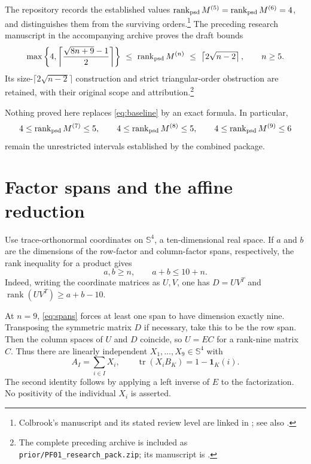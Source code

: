 \documentclass[11pt]{article}
\theoremstyle{remark}\newtheorem{remark}[theorem]{Remark}
\newcommand{\Sym}{\mathbb S}
\newcommand{\tr}{\operatorname{tr}}
\newcommand{\rank}{\operatorname{rank}}
\newcommand{\psdrank}{\operatorname{rank}_{\rm psd}}
\newcommand{\one}{\mathbf 1}
\begin{document}
The repository records the established values $\psdrank M^{(5)}=\psdrank M^{(6)}=4$, and distinguishes them from the surviving orders.\footnote{Colbrook's manuscript and its stated review level are linked in \cite{repo}; see also \cite{colbrook}.} The preceding research manuscript in the accompanying archive proves the draft bounds
\begin{equation}\label{eq:baseline}
 \max\left\{4,\left\lceil\frac{\sqrt{8n+9}-1}{2}\right\rceil\right\}
 \ \leq\ \psdrank M^{(n)}\ \leq\ \left\lceil2\sqrt{n-2}\right\rceil,
 \qquad n\geq5.
\end{equation}
Its size-$\lceil2\sqrt{n-2}\rceil$ construction and strict triangular-order obstruction are retained, with their original scope and attribution.\footnote{The complete preceding archive is included as \texttt{prior/PF01\_research\_pack.zip}; its manuscript is \cite{prior}.}

Nothing proved here replaces \eqref{eq:baseline} by an exact formula. In particular,
\[
 4\leq\psdrank M^{(7)}\leq5,\qquad
 4\leq\psdrank M^{(8)}\leq5,\qquad
 4\leq\psdrank M^{(9)}\leq6
\]
remain the unrestricted intervals established by the combined package.

\section{Factor spans and the affine reduction}
Use trace-orthonormal coordinates on $\Sym^4$, a ten-dimensional real space. If $a$ and $b$ are the dimensions of the row-factor and column-factor spans, respectively, the rank inequality for a product gives
\begin{equation}\label{eq:spans}
 a,b\geq n,\qquad a+b\leq10+n.
\end{equation}
Indeed, writing the coordinate matrices as $U,V$, one has $D=UV^T$ and $\rank(UV^T)\geq a+b-10$.

At $n=9$, \eqref{eq:spans} forces at least one span to have dimension exactly nine. Transposing the symmetric matrix $D$ if necessary, take this to be the row span. Then the column spaces of $U$ and $D$ coincide, so $U=EC$ for a rank-nine matrix $C$. Thus there are linearly independent $X_1,\ldots,X_9\in\Sym^4$ with
\begin{equation}\label{eq:affine}
 A_I=\sum_{i\in I}X_i,
 \qquad
 \tr(X_iB_K)=1-\one_K(i).
\end{equation}
The second identity follows by applying a left inverse of $E$ to the factorization. No positivity of the individual $X_i$ is asserted.
\end{document}
